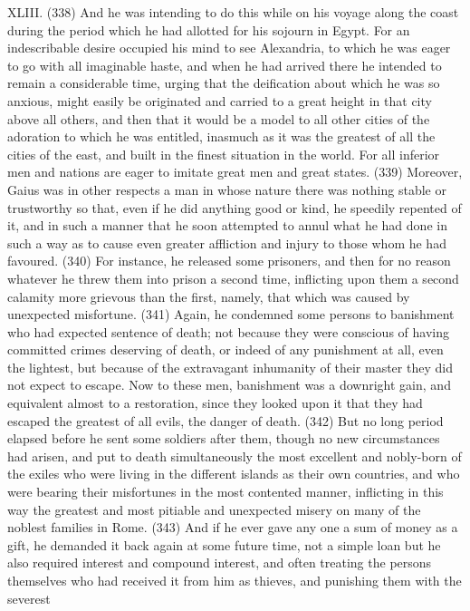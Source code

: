 XLIII. (338) And he was intending to do this while on his voyage along the coast during the period
which he had allotted for his sojourn in Egypt. For an indescribable desire occupied his mind to see
Alexandria, to which he was eager to go with all imaginable haste, and when he had arrived there
he intended to remain a considerable time, urging that the deification about which he was so
anxious, might easily be originated and carried to a great height in that city above all others, and
then that it would be a model to all other cities of the adoration to which he was entitled, inasmuch
as it was the greatest of all the cities of the east, and built in the finest situation in the world. For all
inferior men and nations are eager to imitate great men and great states. (339) Moreover, Gaius
was in other respects a man in whose nature there was nothing stable or trustworthy so that, even
if he did anything good or kind, he speedily repented of it, and in such a manner that he soon
attempted to annul what he had done in such a way as to cause even greater affliction and injury to
those whom he had favoured. (340) For instance, he released some prisoners, and then for no
reason whatever he threw them into prison a second time, inflicting upon them a second calamity
more grievous than the first, namely, that which was caused by unexpected misfortune. (341)
Again, he condemned some persons to banishment who had expected sentence of death; not
because they were conscious of having committed crimes deserving of death, or indeed of any
punishment at all, even the lightest, but because of the extravagant inhumanity of their master they
did not expect to escape. Now to these men, banishment was a downright gain, and equivalent
almost to a restoration, since they looked upon it that they had escaped the greatest of all evils, the
danger of death. (342) But no long period elapsed before he sent some soldiers after them, though
no new circumstances had arisen, and put to death simultaneously the most excellent and
nobly-born of the exiles who were living in the different islands as their own countries, and who
were bearing their misfortunes in the most contented manner, inflicting in this way the greatest and
most pitiable and unexpected misery on many of the noblest families in Rome. (343) And if he ever
gave any one a sum of money as a gift, he demanded it back again at some future time, not a
simple loan but he also required interest and compound interest, and often treating the persons
themselves who had received it from him as thieves, and punishing them with the severest
